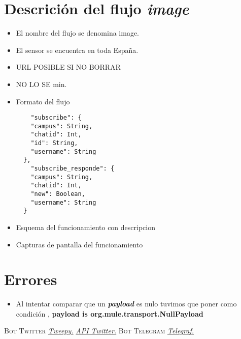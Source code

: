 \documentclass[12pt]{article}
\begin{document}
\section{Descrición del flujo \textit{image}}
    \begin{itemize}
        \item El nombre del flujo se denomina image.
        \item El sensor se encuentra en toda España.
        \item URL POSIBLE SI NO BORRAR
        \item NO LO SE min.
        \item Formato del flujo
    \begin{lstlisting}         
    "subscribe": {
    "campus": String,
    "chatid": Int,
    "id": String,
    "username": String
  },
    "subscribe_responde": {
    "campus": String,
    "chatid": Int,
    "new": Boolean,
    "username": String
  }
        \end{lstlisting}
    \item Esquema del funcionamiento con descripcion
    \item Capturas de pantalla del funcionamiento
\end{itemize}

\section{Errores}
\begin{itemize}
    \item  Al intentar comparar que un \textbf{\textit{payload}} 
     es nulo tuvimos que poner como condición ,
    \textbf{payload is org.mule.transport.NullPayload}
\end{itemize} 

\newpage
\begin{thebibliography}{X}
\textsc{Bot Twitter}
\href{http://docs.tweepy.org/en/v3.4.0/getting_started.html}{\textit{Tweepy.}}
\href{https://developer.twitter.com/en.html}{\textit{API Twitter.}}
\textsc{Bot Telegram}
\href{https://telegraf.js.org/#/}{\textit{Telegraf.}}

\end{thebibliography}
\end{document}
